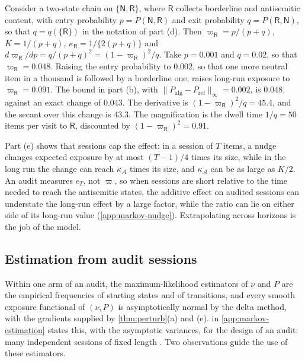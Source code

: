 \begin{example}\label{ex:mk-two-region}
Consider a two-state chain on $\{\mathsf N,\mathsf R\}$, where $\mathsf R$ collects borderline and antisemitic content, with entry probability $p=P(\mathsf N,\mathsf R)$ and exit probability $q=P(\mathsf R,\mathsf N)$, so that $q=q(\{\mathsf R\})$ in the notation of part (d). Then $\varpi_{\mathsf R}=p/(p+q)$, $K=1/(p+q)$, $\kappa_{\mathsf R}=1/\{2(p+q)\}$ and $d\varpi_{\mathsf R}/dp=q/(p+q)^2=(1-\varpi_{\mathsf R})^2/q$. Take $p=0.001$ and $q=0.02$, so that $\varpi_{\mathsf R}=0.048$. Raising the entry probability to $0.002$, so that one more neutral item in a thousand is followed by a borderline one, raises long-run exposure to $\varpi_{\mathsf R}=0.091$. The bound in part (b), with $\|P_{\mathrm{alg}}-P_{\mathrm{ref}}\|_\infty=0.002$, is $0.048$, against an exact change of $0.043$. The derivative is $(1-\varpi_{\mathsf R})^2/q=45.4$, and the secant over this change is $43.3$. The magnification is the dwell time $1/q=50$ items per visit to $\mathsf R$, discounted by $(1-\varpi_{\mathsf R})^2=0.91$.
\end{example}

Part (e) shows that sessions cap the effect: in a session of $T$ items, a nudge changes expected exposure by at most $(T-1)/4$ times its size, while in the long run the change can reach $\kappa_{\mathcal A}$ times its size, and $\kappa_{\mathcal A}$ can be as large as $K/2$. An audit measures $e_T$, not $\varpi$, so when sessions are short relative to the time needed to reach the antisemitic states, the additive effect on audited sessions can understate the long-run effect by a large factor, while the ratio can lie on either side of its long-run value (\cref{app:markov-nudge}). Extrapolating across horizons is the job of the model.
\subsection{Estimation from audit sessions}\label{sec:markov-estimation}

Within one arm of an audit, the maximum-likelihood estimators of $\nu$ and $P$ are the empirical frequencies of starting states and of transitions, and every smooth exposure functional of $(\nu,P)$ is asymptotically normal by the delta method, with the gradients supplied by \cref{thm:perturb}(a) and (e).  in \cref{app:markov-estimation} states this, with the asymptotic variances, for the design of an audit: many independent sessions of fixed length \citep{anderson1957,billingsley1961}. Two observations guide the use of these estimators.


